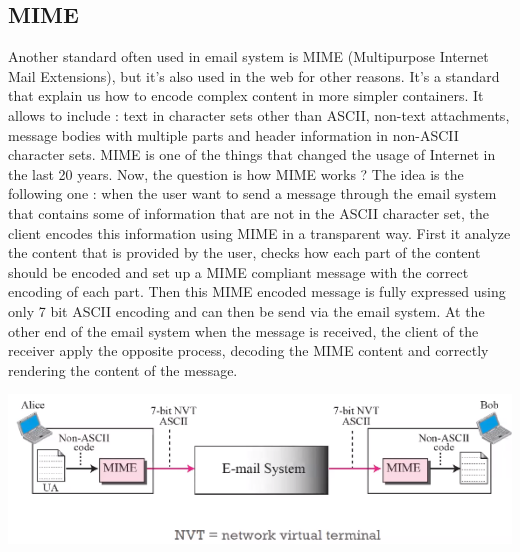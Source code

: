 \subsection{MIME}
Another standard often used in email system is MIME (Multipurpose Internet Mail Extensions), but it's also used in the web for other reasons. It's a standard that explain us how to encode complex content in more simpler containers. It allows to include : text in character sets other than ASCII, non-text attachments, message bodies with multiple parts and header information in non-ASCII character sets. MIME is one of the things that changed the usage of Internet in the last 20 years. Now, the question is how MIME works ? The idea is the following one : when the user want to send a message through the email system that contains some of information that are not in the ASCII character set, the client encodes this information using MIME in a transparent way. First it analyze the content that is provided by the user, checks how each part of the content should be encoded and set up a MIME compliant message with the correct encoding of each part. Then this MIME encoded message is fully expressed using only 7 bit ASCII encoding and can then be send via the email system. At the other end of the email system when the message is received, the client of the receiver apply the opposite process, decoding the MIME content and correctly rendering the content of the message.
\begin{center}
\includegraphics[scale=0.5]{./images/mime_schema.png}
\end{center}
